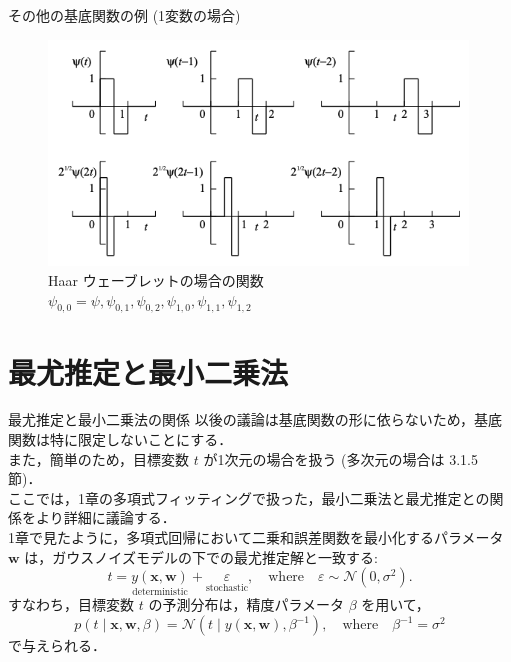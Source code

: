 \documentclass[uplatex,11pt,dvipdfmx,aspectratio=169,unicode,t]{beamer}
\numberwithin{equation}{section}
\newcommand{\CN}{\mathcal{N}}
\newcommand{\bs}[1]{\boldsymbol{#1}}
\newcommand{\1}{\bs{1}}
\newcommand{\0}{\bs{0}}
\begin{document}
\begin{frame}{その他の基底関数の例 (1変数の場合)}
    \begin{figure}
        \centering
        \includegraphics[height=6cm]{prml_fig_wavelet.png}
        \caption{Haar ウェーブレットの場合の関数 $\psi_{0,0} = \psi, \psi_{0,1}, \psi_{0,2}, \psi_{1,0}, \psi_{1,1}, \psi_{1,2}$}
        \label{fig:wavelet}
    \end{figure}
\end{frame}

\section{最尤推定と最小二乗法}

\begin{frame}{最尤推定と最小二乗法の関係}
    以後の議論は基底関数の形に依らないため，基底関数は特に限定しないことにする．\\
    また，簡単のため，目標変数 $t$ が1次元の場合を扱う (多次元の場合は 3.1.5 節)．\\
    \vspace{11pt}
    ここでは，1章の多項式フィッティングで扱った，最小二乗法と最尤推定との関係をより詳細に議論する．\\
    1章で見たように，多項式回帰において二乗和誤差関数を最小化するパラメータ $\bs{w}$ は，ガウスノイズモデルの下での最尤推定解と一致する:
    \begin{equation}
        t = \underset{\text{deterministic}}{y(\bs{x},\bs{w})} + \underset{\text{stochastic}}{\varepsilon}, \quad \text{where} \quad \varepsilon \sim \CN(0,\sigma^{2}).
    \end{equation}
    すなわち，目標変数 $t$ の予測分布は，精度パラメータ $\beta$ を用いて，
    \begin{equation}
        p(t \mid \bs{x},\bs{w},\beta) = \CN(t \mid y(\bs{x},\bs{w}), \beta^{-1}), \quad \text{where} \quad \beta^{-1} = \sigma^{2}
    \end{equation}
    で与えられる．
\end{frame}
\end{document}
